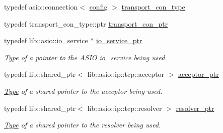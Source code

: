 \begin{DoxyCompactItemize}
typedef asio\+::connection$<$ \mbox{\hyperlink{classconfig}{config}} $>$ \mbox{\hyperlink{classwebsocketpp_1_1transport_1_1asio_1_1endpoint_a75f3102766fd3ba8230e99a2b0e00457}{transport\+\_\+con\+\_\+type}}
\item 
typedef transport\+\_\+con\+\_\+type\+::ptr \mbox{\hyperlink{classwebsocketpp_1_1transport_1_1asio_1_1endpoint_ac5fc306f32d15f92dd1b22366eaba62d}{transport\+\_\+con\+\_\+ptr}}
\item 
\mbox{\label{classwebsocketpp_1_1transport_1_1asio_1_1endpoint_acc7e89c6427514628f551cf3f795b7e0}} 
typedef lib\+::asio\+::io\+\_\+service $\ast$ \mbox{\hyperlink{classwebsocketpp_1_1transport_1_1asio_1_1endpoint_acc7e89c6427514628f551cf3f795b7e0}{io\+\_\+service\+\_\+ptr}}
\begin{DoxyCompactList}\small\item\em \mbox{\hyperlink{struct_type}{Type}} of a pointer to the A\+S\+IO io\+\_\+service being used. \end{DoxyCompactList}\item 
\mbox{\label{classwebsocketpp_1_1transport_1_1asio_1_1endpoint_aaff1078ca1ea0fa4f47bbabcae255c16}} 
typedef lib\+::shared\+\_\+ptr$<$ lib\+::asio\+::ip\+::tcp\+::acceptor $>$ \mbox{\hyperlink{classwebsocketpp_1_1transport_1_1asio_1_1endpoint_aaff1078ca1ea0fa4f47bbabcae255c16}{acceptor\+\_\+ptr}}
\begin{DoxyCompactList}\small\item\em \mbox{\hyperlink{struct_type}{Type}} of a shared pointer to the acceptor being used. \end{DoxyCompactList}\item 
\mbox{\label{classwebsocketpp_1_1transport_1_1asio_1_1endpoint_aff1899396fa9d1439e00ca53c56676a5}} 
typedef lib\+::shared\+\_\+ptr$<$ lib\+::asio\+::ip\+::tcp\+::resolver $>$ \mbox{\hyperlink{classwebsocketpp_1_1transport_1_1asio_1_1endpoint_aff1899396fa9d1439e00ca53c56676a5}{resolver\+\_\+ptr}}
\begin{DoxyCompactList}\small\item\em \mbox{\hyperlink{struct_type}{Type}} of a shared pointer to the resolver being used. \end{DoxyCompactList}\item 
\mbox{\label{classwebsocketpp_1_1transport_1_1asio_1_1endpoint_a1802f5762009dbed117ff793fa87468f}} 

\end{DoxyCompactItemize}
